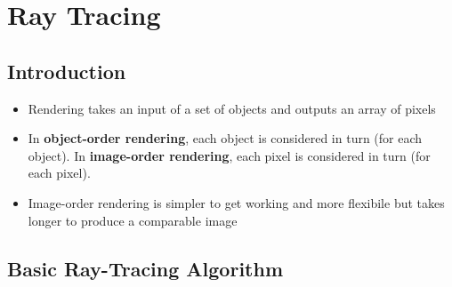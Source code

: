 
\section{Ray Tracing}

\subsection{Introduction}

\begin{itemize}
  \item Rendering takes an input of a set of objects and outputs an array of pixels
  \item In \textbf{object-order rendering}, each object is considered in turn (for each object). In \textbf{image-order rendering}, each pixel is considered in turn (for each pixel).
  \item Image-order rendering is simpler to get working and more flexibile but takes longer to produce a comparable image
\end{itemize}

\subsection{Basic Ray-Tracing Algorithm}
